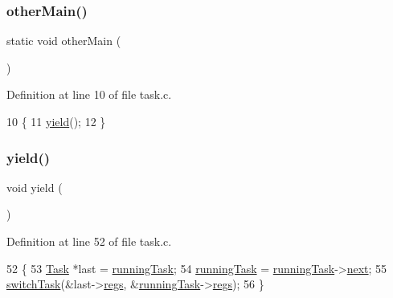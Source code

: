 \mbox{\label{a00047_a4337f8ca98d2a8f8e09bf6e26b4e8bb0_a4337f8ca98d2a8f8e09bf6e26b4e8bb0}} 
\subsubsection{\texorpdfstring{other\+Main()}{otherMain()}}
{\footnotesize\ttfamily static void other\+Main (\begin{DoxyParamCaption}{ }\end{DoxyParamCaption})\hspace{0.3cm}{\ttfamily [static]}}



Definition at line 10 of file task.\+c.


\begin{DoxyCode}
10                         \{
11     \hyperlink{a00047_a58c8b2ad0ea491a6642e5e1cbd358c89_a58c8b2ad0ea491a6642e5e1cbd358c89}{yield}();
12 \}
\end{DoxyCode}
\mbox{\label{a00047_a58c8b2ad0ea491a6642e5e1cbd358c89_a58c8b2ad0ea491a6642e5e1cbd358c89}} 
\subsubsection{\texorpdfstring{yield()}{yield()}}
{\footnotesize\ttfamily void yield (\begin{DoxyParamCaption}{ }\end{DoxyParamCaption})}



Definition at line 52 of file task.\+c.


\begin{DoxyCode}
52              \{
53     \hyperlink{a00136}{Task} *last = \hyperlink{a00047_a2c195d425b4a6791b3a89f7b219f93d9_a2c195d425b4a6791b3a89f7b219f93d9}{runningTask};
54     \hyperlink{a00047_a2c195d425b4a6791b3a89f7b219f93d9_a2c195d425b4a6791b3a89f7b219f93d9}{runningTask} = \hyperlink{a00047_a2c195d425b4a6791b3a89f7b219f93d9_a2c195d425b4a6791b3a89f7b219f93d9}{runningTask}->\hyperlink{a00136_a8b6b50960a19f7bae344ef0cc8ec4e7d_a8b6b50960a19f7bae344ef0cc8ec4e7d}{next};
55     \hyperlink{a00050_a2425ca34147fccde2d1503332d21c5bd_a2425ca34147fccde2d1503332d21c5bd}{switchTask}(&last->\hyperlink{a00136_a136b243ee52ff89e9ba97f4e4dba19bb_a136b243ee52ff89e9ba97f4e4dba19bb}{regs}, &\hyperlink{a00047_a2c195d425b4a6791b3a89f7b219f93d9_a2c195d425b4a6791b3a89f7b219f93d9}{runningTask}->\hyperlink{a00136_a136b243ee52ff89e9ba97f4e4dba19bb_a136b243ee52ff89e9ba97f4e4dba19bb}{regs});
56 \}
\end{DoxyCode}


